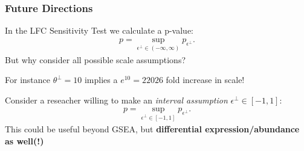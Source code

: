 \documentclass[11pt]{beamer}
\begin{document}
\begin{frame}
  \frametitle{Future Directions}
  In the LFC Sensitivity Test we calculate a p-value:
  \begin{align*}
    p= \sup_{\epsilon^\perp \in (-\infty, \infty)} p_{\epsilon^\perp}.
  \end{align*}
  But why consider all possible scale assumptions?

  \pause
  \vspace{10px}
  For instance \(\theta^\perp=10\) implies a \(e^{10}=22026\) fold increase in scale!

  \pause
  \vspace{10px}
  Consider a reseacher willing to make an \textit{interval assumption} \(\epsilon^\perp \in [-1,1]\):
  \begin{align*}
    p= \sup_{\epsilon^\perp \in [-1, 1]} p_{\epsilon^\perp}.
  \end{align*}
  This could be useful beyond GSEA, but \textbf{differential expression/abundance as well(!)}
 
\end{frame}
\end{document}
